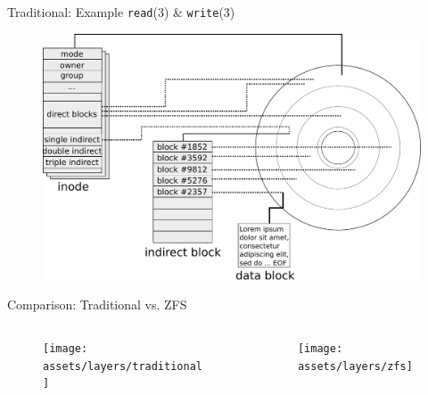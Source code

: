 \begin{frame}{Traditional: Example \texttt{read}(3) \& \texttt{write}(3)}
	\begin{figure}
		\centering
		\includegraphics[height=0.75\textheight]{assets/traditional_fs}
	\end{figure}
\end{frame}

\begin{frame}{Comparison: Traditional vs. ZFS}
		\begin{columns}[c]
			\begin{column}{0.4\textwidth}
				\begin{figure}
					\centering
					\texttt{[image: assets/layers/traditional]}
				\end{figure}
			\end{column}
			\begin{column}{0.4\textwidth}
				\begin{figure}
					\centering
					\texttt{[image: assets/layers/zfs]}
				\end{figure}
			\end{column}
		\end{columns}
\end{frame}


